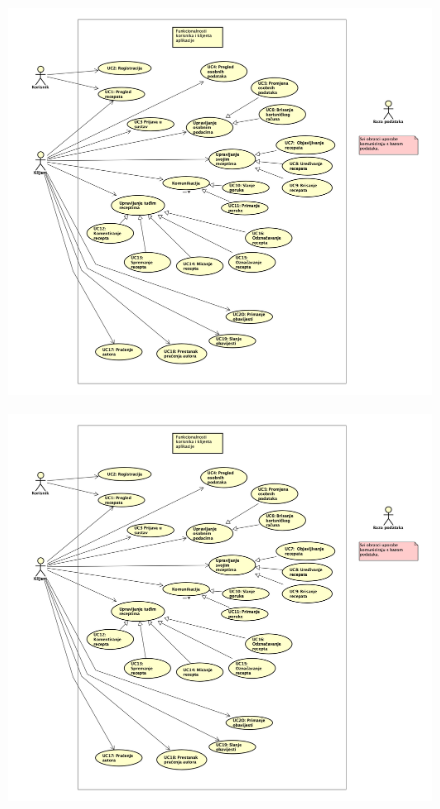 		\begin{figure}[H]
			\includegraphics[scale=0.1]{dijagrami/Korisnik_klijent.png} 
			\centering
			\caption{}
			\label{fig:id2}
		\end{figure}
		\begin{figure}[H]
			\includegraphics[scale=0.1]{dijagrami/Korisnik_klijent.png} 
			\centering
			\caption{}
			\label{fig:id3}
		\end{figure}
